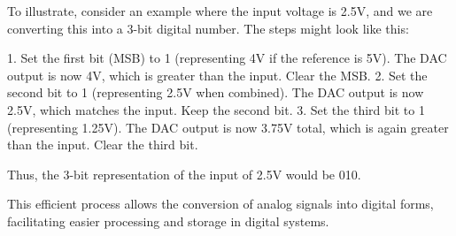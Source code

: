 To illustrate, consider an example where the input voltage is 2.5V, and we are converting this into a 3-bit digital number. The steps might look like this:

1. Set the first bit (MSB) to 1 (representing 4V if the reference is 5V). The DAC output is now 4V, which is greater than the input. Clear the MSB.
2. Set the second bit to 1 (representing 2.5V when combined). The DAC output is now 2.5V, which matches the input. Keep the second bit.
3. Set the third bit to 1 (representing 1.25V). The DAC output is now 3.75V total, which is again greater than the input. Clear the third bit.

Thus, the 3-bit representation of the input of 2.5V would be 010.

This efficient process allows the conversion of analog signals into digital forms, facilitating easier processing and storage in digital systems.

